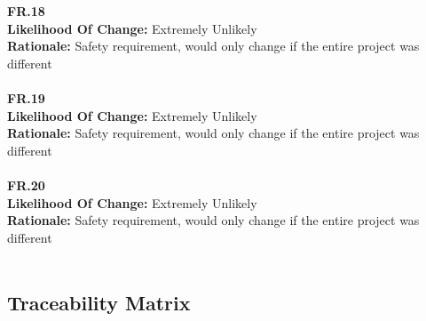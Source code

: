 \documentclass[12pt]{article}
\begin{document}
  \noindent \textbf{FR.18}\\  
  \textbf{Likelihood Of Change:} Extremely Unlikely\\ 
  \textbf{Rationale:} Safety requirement, would only change if the entire project was different\\\\

  \noindent \textbf{FR.19}\\  
  \textbf{Likelihood Of Change:} Extremely Unlikely\\ 
  \textbf{Rationale:} Safety requirement, would only change if the entire project was different\\\\

  \noindent \textbf{FR.20}\\  
  \textbf{Likelihood Of Change:} Extremely Unlikely\\ 
  \textbf{Rationale:} Safety requirement, would only change if the entire project was different\\\\

\subsection{Traceability Matrix}
\end{document}
